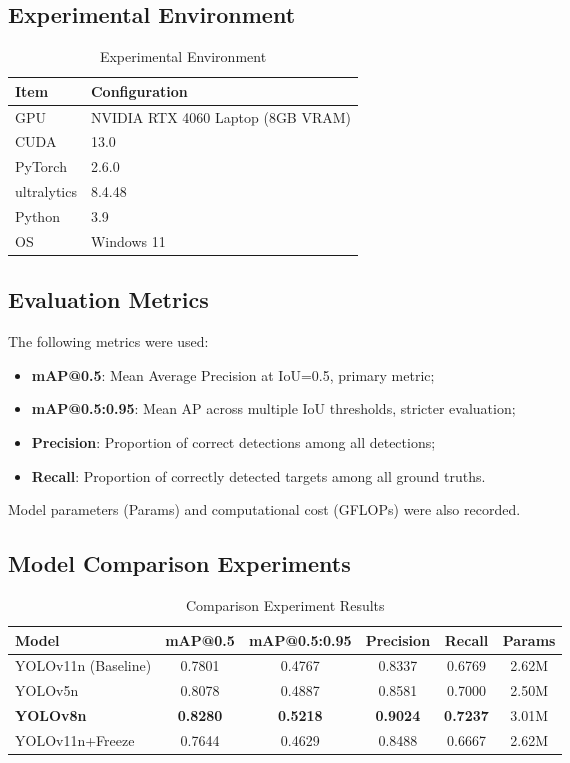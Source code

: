 \documentclass[12pt,a4paper]{article}
\begin{document}
\subsection{Experimental Environment}

\begin{table}[H]
\centering
\caption{Experimental Environment}
\begin{tabular}{ll}
\toprule
Item & Configuration \\
\midrule
GPU & NVIDIA RTX 4060 Laptop (8GB VRAM) \\
CUDA & 13.0 \\
PyTorch & 2.6.0 \\
ultralytics & 8.4.48 \\
Python & 3.9 \\
OS & Windows 11 \\
\bottomrule
\end{tabular}
\end{table}

\subsection{Evaluation Metrics}

The following metrics were used:
\begin{itemize}[noitemsep]
  \item \textbf{mAP@0.5}: Mean Average Precision at IoU=0.5, primary metric;
  \item \textbf{mAP@0.5:0.95}: Mean AP across multiple IoU thresholds, stricter evaluation;
  \item \textbf{Precision}: Proportion of correct detections among all detections;
  \item \textbf{Recall}: Proportion of correctly detected targets among all ground truths.
\end{itemize}

Model parameters (Params) and computational cost (GFLOPs) were also recorded.

\subsection{Model Comparison Experiments}

\begin{table}[H]
\centering
\caption{Comparison Experiment Results}
\label{tab:comparison}
\begin{tabular}{lccccc}
\toprule
Model & mAP@0.5 & mAP@0.5:0.95 & Precision & Recall & Params \\
\midrule
YOLOv11n (Baseline) & 0.7801 & 0.4767 & 0.8337 & 0.6769 & 2.62M \\
YOLOv5n & 0.8078 & 0.4887 & 0.8581 & 0.7000 & 2.50M \\
\textbf{YOLOv8n} & \textbf{0.8280} & \textbf{0.5218} & \textbf{0.9024} & \textbf{0.7237} & 3.01M \\
YOLOv11n+Freeze & 0.7644 & 0.4629 & 0.8488 & 0.6667 & 2.62M \\
\bottomrule
\end{tabular}
\end{table}
\end{document}
